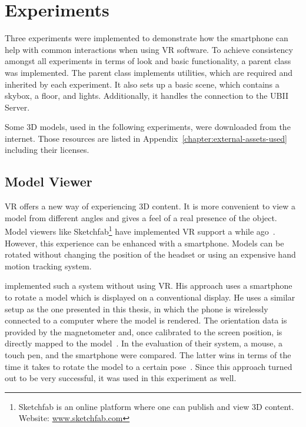 \section{Experiments}\label{section:experiments}

Three experiments were implemented to demonstrate how the smartphone can help with common interactions when using \ac{VR} software.
To achieve consistency amongst all experiments in terms of look and basic functionality, a parent class was implemented. The parent class implements utilities, which are required and inherited by each experiment. It also sets up a basic scene, which contains a skybox, a floor, and lights. Additionally, it handles the connection to the \ac{UBII} Server.

Some \ac{3D} models, used in the following experiments, were downloaded from the internet. Those resources are listed in Appendix~\ref{chapter:external-assets-used} including their licenses.

\subsection{Model Viewer}\label{subsection:model-viewer}

\acl{VR} offers a new way of experiencing \ac{3D} content. It is more convenient to view a model from different angles and gives a feel of a real presence of the object. Model viewers like Sketchfab\footnote{Sketchfab is an online platform where one can publish and view \ac{3D} content. Website: \href{https://sketchfab.com}{www.sketchfab.com}} have implemented \ac{VR} support a while ago~\cite{Denoyel.2016}. However, this experience can be enhanced with a smartphone. Models can be rotated without changing the position of the headset or using an expensive hand motion tracking system.

\citeauthor{Katzakis.2010} implemented such a system without using \ac{VR}. His approach uses a smartphone to rotate a model which is displayed on a conventional display. He uses a similar setup as the one presented in this thesis, in which the phone is wirelessly connected to a computer where the model is rendered. The orientation data is provided by the magnetometer and, once calibrated to the screen position, is directly mapped to the model~\cite[139]{Katzakis.2010}. In the evaluation of their system, a mouse, a touch pen, and the smartphone were compared. The latter wins in terms of the time it takes to rotate the model to a certain pose~\cite[140]{Katzakis.2010}.
Since this approach turned out to be very successful, it was used in this experiment as well.

